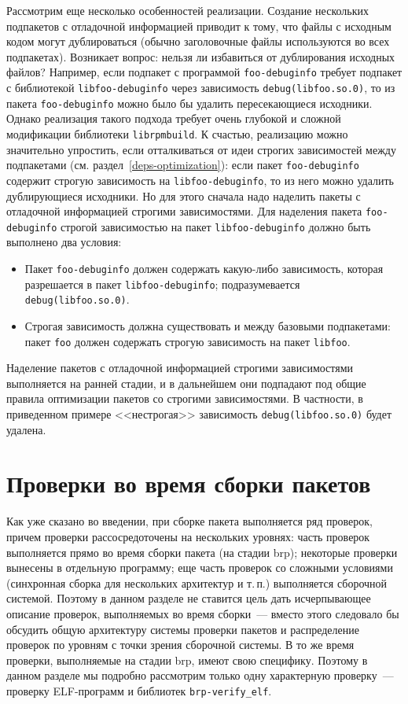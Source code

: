 \documentclass[russian,a4paper,12pt,titlepage]{article}
\begin{document}
Рассмотрим еще несколько особенностей реализации.  Создание нескольких подпакетов с отладочной информацией приводит к тому,
что файлы с исходным кодом могут дублироваться (обычно заголовочные файлы используются во всех подпакетах).  Возникает вопрос:
нельзя ли избавиться от дублирования исходных файлов?  Например, если подпакет с программой \verb|foo-debuginfo| требует
подпакет с библиотекой \verb|libfoo-debuginfo| через зависимость \verb|debug(libfoo.so.0)|, то из пакета \verb|foo-debuginfo|
можно было бы удалить пересекающиеся исходники.  Однако реализация такого подхода требует очень глубокой и сложной модификации
библиотеки \verb|librpmbuild|.  К счастью, реализацию можно значительно упростить, если отталкиваться от идеи строгих зависимостей
между подпакетами (см. раздел~\ref{deps-optimization}): если пакет \verb|foo-debuginfo| содержит строгую зависимость на
\verb|libfoo-debuginfo|, то из него можно удалить дублирующиеся исходники.  Но для этого сначала надо наделить
пакеты с отладочной информацией строгими зависимостями.  Для наделения пакета \verb|foo-debuginfo| строгой зависимостью
на пакет \verb|libfoo-debuginfo| должно быть выполнено два условия:
\begin{itemize}
\item Пакет \verb|foo-debuginfo| должен содержать какую-либо зависимость, которая разрешается в пакет \verb|libfoo-debuginfo|;
подразумевается \verb|debug(libfoo.so.0)|.
\item Строгая зависимость должна существовать и между базовыми подпакетами: пакет \verb|foo| должен содержать строгую зависимость
на пакет \verb|libfoo|.
\end{itemize}

Наделение пакетов с отладочной информацией строгими зависимостями выполняется на ранней стадии, и в дальнейшем
они подпадают под общие правила оптимизации пакетов со строгими зависимостями.  В частности, в приведенном
примере <<нестрогая>> зависимость \verb|debug(libfoo.so.0)| будет удалена.

\section{Проверки во время сборки пакетов}
\label{brp-verify}
Как уже сказано во введении, при сборке пакета выполняется ряд проверок, причем проверки рассосредоточены на нескольких уровнях:
часть проверок выполняется прямо во время сборки пакета (на стадии brp); некоторые проверки вынесены в отдельную программу; еще
часть проверок со сложными условиями (синхронная сборка для нескольких архитектур и т.\,п.) выполняется сборочной системой.
Поэтому в данном разделе не ставится цель дать исчерпывающее описание проверок, выполняемых во время сборки~--- вместо этого
следовало бы обсудить общую архитектуру системы проверки пакетов и распределение проверок по уровням с точки зрения сборочной
системы.  В то же время проверки, выполняемые на стадии brp, имеют свою специфику.  Поэтому в данном разделе мы подробно рассмотрим
только одну характерную проверку~--- проверку ELF-программ и библиотек \verb|brp-verify_elf|.
\end{document}
